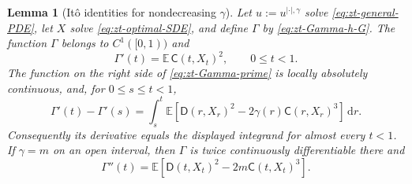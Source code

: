 \documentclass[10pt]{amsart}
\newtheorem{lemma}[lemma]{Lemma}
\theoremstyle{definition}
\theoremstyle{remark}
\numberwithin{equation}{section}
\newcommand{\E}{\mathbb E}
\newcommand{\1}{\mathbf 1}
\newcommand{\dd}{\,\mathrm d}
\begin{document}
\begin{lemma}[It\^o identities for nondecreasing $\gamma$]
\label{lem:zt-Ito-identities-general}
Let $u:=u^{|\cdot|,\gamma}$ solve \eqref{eq:zt-general-PDE}, let $X$ solve \eqref{eq:zt-optimal-SDE}, and define $\Gamma$ by \eqref{eq:zt-Gamma-h-G}. The function $\Gamma$ belongs to $C^1([0,1))$ and
\begin{equation}
 \Gamma'(t)=\E\,\mathsf C(t,X_t)^2,
 \qquad 0\leq t<1.
 \label{eq:zt-Gamma-prime}
\end{equation}
The function on the right side of \eqref{eq:zt-Gamma-prime} is locally absolutely continuous, and, for $0\leq s\leq t<1$,
\begin{equation}
 \Gamma'(t)-\Gamma'(s)
 =\int_s^t\E\left[\mathsf D(r,X_r)^2
             -2\gamma(r)\mathsf C(r,X_r)^3\right]\dd r.
 \label{eq:zt-Gamma-prime-integral}
\end{equation}
Consequently its derivative equals the displayed integrand for almost every $t<1$.  If $\gamma=m$ on an open interval, then $\Gamma$ is twice continuously differentiable there and
\begin{equation}
 \Gamma''(t)=\E\left[\mathsf D(t,X_t)^2-2m\mathsf C(t,X_t)^3\right].
 \label{eq:zt-Gamma-second-x}
\end{equation}
\end{lemma}
\end{document}

